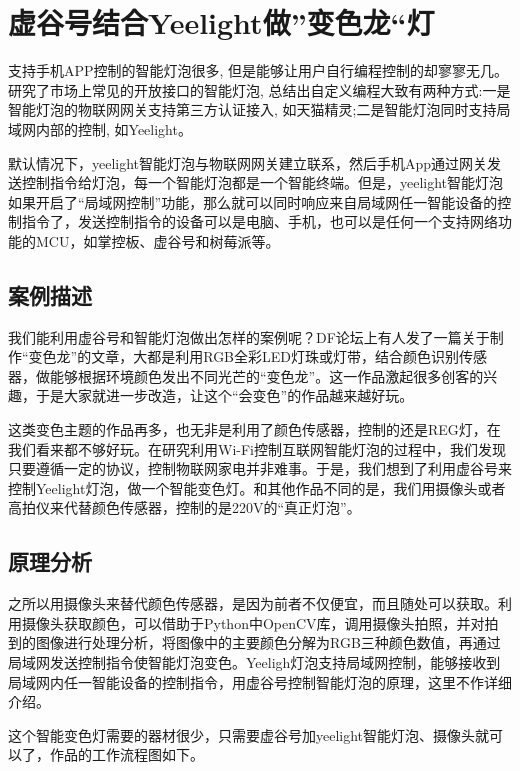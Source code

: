 \documentclass[letterpaper,10pt,english]{sphinxmanual}
\begin{document}
\section{虚谷号结合Yeelight做”变色龙“灯}
\label{\detokenize{09.case/9.1-yeelight::doc}}\label{\detokenize{09.case/9.1-yeelight:yeelight}}
支持手机APP控制的智能灯泡很多, 但是能够让用户自行编程控制的却寥寥无几。研究了市场上常见的开放接口的智能灯泡, 总结出自定义编程大致有两种方式:一是智能灯泡的物联网网关支持第三方认证接入, 如天猫精灵;二是智能灯泡同时支持局域网内部的控制, 如Yeelight。

默认情况下，yeelight智能灯泡与物联网网关建立联系，然后手机App通过网关发送控制指令给灯泡，每一个智能灯泡都是一个智能终端。但是，yeelight智能灯泡如果开启了“局域网控制”功能，那么就可以同时响应来自局域网任一智能设备的控制指令了，发送控制指令的设备可以是电脑、手机，也可以是任何一个支持网络功能的MCU，如掌控板、虚谷号和树莓派等。


\subsection{案例描述}
\label{\detokenize{09.case/9.1-yeelight:id1}}
我们能利用虚谷号和智能灯泡做出怎样的案例呢？DF论坛上有人发了一篇关于制作“变色龙”的文章，大都是利用RGB全彩LED灯珠或灯带，结合颜色识别传感器，做能够根据环境颜色发出不同光芒的“变色龙”。这一作品激起很多创客的兴趣，于是大家就进一步改造，让这个“会变色”的作品越来越好玩。

这类变色主题的作品再多，也无非是利用了颜色传感器，控制的还是REG灯，在我们看来都不够好玩。在研究利用Wi-Fi控制互联网智能灯泡的过程中，我们发现只要遵循一定的协议，控制物联网家电并非难事。于是，我们想到了利用虚谷号来控制Yeelight灯泡，做一个智能变色灯。和其他作品不同的是，我们用摄像头或者高拍仪来代替颜色传感器，控制的是220V的“真正灯泡”。


\subsection{原理分析}
\label{\detokenize{09.case/9.1-yeelight:id2}}
之所以用摄像头来替代颜色传感器，是因为前者不仅便宜，而且随处可以获取。利用摄像头获取颜色，可以借助于Python中OpenCV库，调用摄像头拍照，并对拍到的图像进行处理分析，将图像中的主要颜色分解为RGB三种颜色数值，再通过局域网发送控制指令使智能灯泡变色。Yeeligh灯泡支持局域网控制，能够接收到局域网内任一智能设备的控制指令，用虚谷号控制智能灯泡的原理，这里不作详细介绍。

这个智能变色灯需要的器材很少，只需要虚谷号加yeelight智能灯泡、摄像头就可以了，作品的工作流程图如下。
\end{document}
